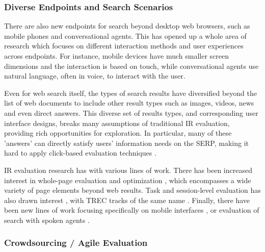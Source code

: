 \subsubsection{Diverse Endpoints and Search Scenarios}

There are also new endpoints for search beyond desktop web browsers, such as mobile phones and conversational agents. This has opened up a whole area of research which focuses on different interaction methods and user experiences across endpoints. For instance, mobile devices have much smaller screen dimensions and the interaction is based on touch, while conversational agents use natural language, often in voice, to interact with the user.

Even for web search itself, the types of search results have diversified beyond the list of web documents to include other result types such as images, videos, news and even direct answers. This diverse set of results types, and corresponding user interface designs, breaks many assumptions of traditional IR evaluation, providing rich opportunities for exploration. In particular, many of these 'answers' can directly satisfy users' information needs on the SERP, making it hard to apply click-based evaluation techniques \citep{Li2009GA,diriye2012leaving}.

IR evaluation research has with various lines of work. There has been increased interest in whole-page evaluation and optimization \citep{Zhou:2012}, which encompasses a wide variety of page elements beyond web results. %
%
Task and session-level evaluation has also drawn interest \citep{KanoulasCCS11, CarteretteKHC14}, with TREC tracks of the same name \citep{carterette2014overview}. Finally, there have been new lines of work focusing specifically on mobile interfaces \citep{VermaYC16}, or evaluation of search with spoken agents \citep{Kiseleva:2016}.

\subsubsection{Crowdsourcing / Agile Evaluation}

